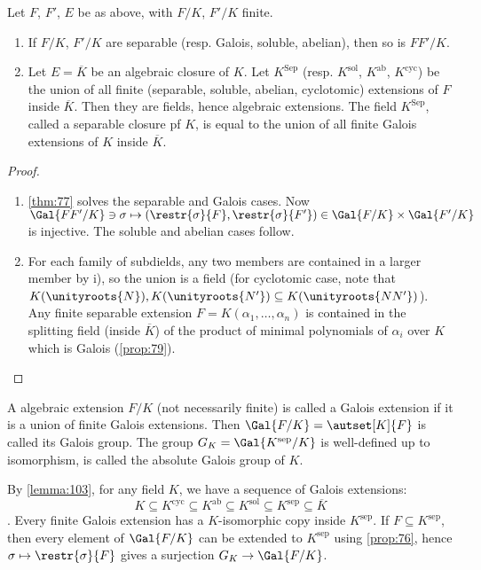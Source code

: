 \begin{lemma}
  \label{lemma:103}
  Let $F$, $F'$, $E$ be as above, with $F/K$, $F'/K$ finite.
  \begin{enumerate}
  \item If $F/K$, $F'/K$ are separable (resp. Galois, soluble, abelian), then so is $FF'/K$.
  \item Let $E = \overline{K}$ be an algebraic closure of $K$. Let $K^{\text{Sep}}$ (resp. $K^{\text{sol}}$, $K^{\text{ab}}$, $K^{\text{cyc}}$) be the union of all finite (separable, soluble, abelian, cyclotomic) extensions of $F$ inside $\overline{K}$. Then they are fields, hence algebraic extensions. The field $K^{\text{Sep}}$, called a separable closure pf $K$, is equal to the union of all finite Galois extensions of $K$ inside $\overline{K}$.
  \end{enumerate}
\end{lemma}

\begin{proof}
  \begin{enumerate}
  \item \autoref{thm:77} solves the separable and Galois cases. Now $\Gal{FF'/K} \ni \sigma \mapsto \left(\restr{\sigma}{F}, \restr{\sigma}{F'}\right) \in \Gal{F/K}\times\Gal{F'/K}$ is injective. The soluble and abelian cases follow.

  \item For each family of subdields, any two members are contained in a larger member by i), so the union is a field (for cyclotomic case, note that $K(\unityroots{N}), K(\unityroots{N'}) \subseteq K(\unityroots{NN'})$). Any finite separable extension $F = K(\alpha_1, \dotsc, \alpha_n)$ is contained in the splitting field (inside $\overline{K}$) of the product of minimal polynomials of $\alpha_i$ over $K$ which is Galois (\autoref{prop:79}).
  \end{enumerate}
\end{proof}

\begin{definition}
  A algebraic extension $F/K$ (not necessarily finite) is called a Galois extension if it is a union of finite Galois extensions. Then $\Gal{F/K} = \autset[K]{F}$ is called its Galois group. The group $G_K = \Gal{K^{\text{sep}}/K}$ is well-defined up to isomorphism, is called the absolute Galois group of $K$.
\end{definition}

By \autoref{lemma:103}, for any field $K$, we have a sequence of Galois extensions: 
\[
K \subseteq K^{\text{cyc}} \subseteq K^{\text{ab}} \subseteq K^{\text{sol}} \subseteq K^{\text{sep}} \subseteq \overline{K}
\].
Every finite Galois extension has a $K$-isomorphic copy inside $K^{\text{sep}}$. If $F \subseteq K^{\text{sep}}$, then every element of $\Gal{F/K}$ can be extended to $K^{\text{sep}}$ using \autoref{prop:76}, hence $\sigma \mapsto \restr{\sigma}{F}$ gives a surjection $G_K \rightarrow \Gal{F/K}$.

